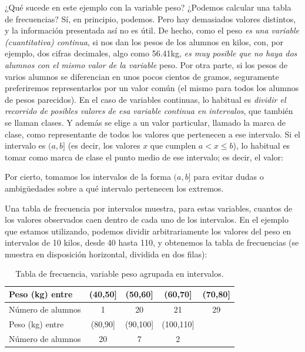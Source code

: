 ¿Qué sucede en este ejemplo con la variable peso? ¿Podemos calcular
una tabla de frecuencias? Sí, en principio, podemos. Pero hay demasiados valores
distintos, y la información presentada así no es útil. De hecho, como el peso
{\em es una variable (cuantitativa) continua}, si nos dan los
pesos de los alumnos en kilos, con, por ejemplo, dos cifras decimales, algo como 56.41kg, {\em es muy posible
que no haya dos alumnos con el mismo valor de la variable} peso. Por otra parte,
si los pesos de varios alumnos se diferencian en unos pocos cientos de
gramos, seguramente preferiremos representarlos por un valor común (el mismo
para todos los alumnos de pesos parecidos). En el caso de variables continuas,
lo habitual es {\em dividir el recorrido de posibles valores de esa variable
continua en intervalos}, que también se llaman clases.
Y además se elige a un valor particular, llamado la {\sf marca de clase}, como representante de todos los valores que pertenecen
a ese intervalo. Si el intervalo es $(a,b]$ (es decir, los valores $x$ que cumplen $a<x\leq b$), lo habitual es tomar como marca de clase el punto medio de ese intervalo; es decir, el valor:
\begin{center}
\end{center}
Por cierto, tomamos los intervalos de la forma $(a,b]$ para evitar dudas o ambigüedades sobre a qué intervalo pertenecen los extremos.


Una {\sf tabla de frecuencia por intervalos} muestra, para estas variables, cuantos de los valores observados caen dentro de
cada uno de los intervalos. En el ejemplo que estamos utilizando, podemos dividir arbitrariamente los
valores del peso en intervalos de 10 kilos, desde 40 hasta 110, y obtenemos
la tabla de frecuencias (se muestra en disposición horizontal, dividida en dos filas):
\begin{table}[ht]
\centering
\begin{tabular}{lcccc}
  \hline
Peso (kg) entre & (40,50] & (50,60] & (60,70] & (70,80] \\
  \hline
Número de alumnos &   1 &  20 &  21 &  29\\
   \hline\hline
Peso (kg) entre & (80,90] & (90,100] & (100,110] \\
  \hline
Número de alumnos &    20 &   7 &   2 \\
   \hline
\end{tabular}
\caption{Tabla de frecuencia, variable peso agrupada en intervalos.}
\label{cap01:tabla:FrecuenciaPesoClase}
\end{table}




